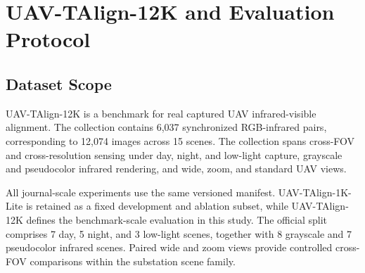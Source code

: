 
\section{UAV-TAlign-12K and Evaluation Protocol}

\subsection{Dataset Scope}

UAV-TAlign-12K is a benchmark for real captured UAV infrared-visible alignment. The collection
contains 6,037 synchronized RGB-infrared pairs, corresponding to 12,074 images across 15 scenes.
The collection spans cross-FOV and cross-resolution sensing under day, night, and low-light capture,
grayscale and pseudocolor infrared rendering, and wide, zoom, and standard UAV views.

All journal-scale experiments use the same versioned manifest. UAV-TAlign-1K-Lite is retained as
a fixed development and ablation subset, while UAV-TAlign-12K defines the benchmark-scale
evaluation in this study. The official split comprises 7 day, 5 night, and 3 low-light scenes,
together with 8 grayscale and 7 pseudocolor infrared scenes. Paired wide and zoom views
provide controlled cross-FOV comparisons within the substation scene family.

